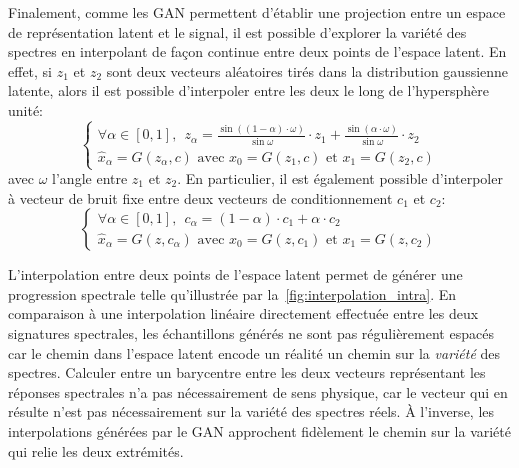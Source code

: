 Finalement, comme les \gls{GAN} permettent d'établir une projection entre un espace de représentation latent et le signal, il est possible d'explorer la variété des spectres en interpolant de façon continue entre deux points de l'espace latent. En effet, si $z_1$ et $z_2$ sont deux vecteurs aléatoires tirés dans la distribution gaussienne latente, alors il est possible d'interpoler entre les deux le long de l'hypersphère unité:
\begin{equation}
	\begin{cases}
		\forall \alpha \in [0,1],~~z_\alpha = \frac{\sin((1 - \alpha)\cdot \omega)}{\sin{\omega}} \cdot z_1 + \frac{\sin(\alpha \cdot \omega)}{\sin{\omega}} \cdot z_2\\
		\hat{x}_\alpha = G(z_\alpha, c) \text{ avec } x_0 = G(z_1, c) \text{ et } x_1 = G(z_2, c)
	\end{cases}
\end{equation}
avec $\omega$ l'angle entre $z_1$ et $z_2$. En particulier, il est également possible d'interpoler à vecteur de bruit fixe entre deux vecteurs de conditionnement $c_1$ et $c_2$:
\begin{equation}
	\begin{cases}
		\forall \alpha \in [0,1],~~c_\alpha = (1-\alpha) \cdot c_1 + \alpha \cdot c_2\\
		\hat{x}_\alpha = G(z, c_\alpha) \text{ avec } x_0 = G(z, c_1) \text{ et } x_1 = G(z, c_2)
	\end{cases}
\end{equation}

L'interpolation entre deux points de l'espace latent permet de générer une progression spectrale telle qu'illustrée par la~\cref{fig:interpolation_intra}. En comparaison à une interpolation linéaire directement effectuée entre les deux signatures spectrales, les échantillons générés ne sont pas régulièrement espacés car le chemin dans l'espace latent encode un réalité un chemin sur la \emph{variété} des spectres. Calculer entre un barycentre entre les deux vecteurs représentant les réponses spectrales n'a pas nécessairement de sens physique, car le vecteur qui en résulte n'est pas nécessairement sur la variété des spectres réels. À l'inverse, les interpolations générées par le \gls{GAN} approchent fidèlement le chemin sur la variété qui relie les deux extrémités.

